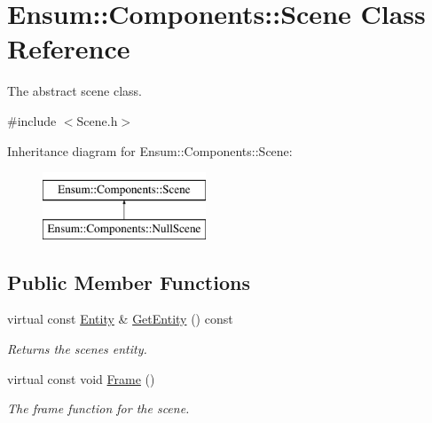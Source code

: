 \hypertarget{class_ensum_1_1_components_1_1_scene}{}\section{Ensum\+:\+:Components\+:\+:Scene Class Reference}
\label{class_ensum_1_1_components_1_1_scene}


The abstract scene class.  




{\ttfamily \#include $<$Scene.\+h$>$}

Inheritance diagram for Ensum\+:\+:Components\+:\+:Scene\+:\begin{figure}[H]
\begin{center}
\leavevmode
\includegraphics[height=2.000000cm]{class_ensum_1_1_components_1_1_scene}
\end{center}
\end{figure}
\subsection*{Public Member Functions}
\begin{DoxyCompactItemize}
\item 
virtual const \hyperlink{struct_ensum_1_1_components_1_1_entity}{Entity} \& \hyperlink{class_ensum_1_1_components_1_1_scene_ab614d491401edd9db3584d4e61ef6416}{Get\+Entity} () const \hypertarget{class_ensum_1_1_components_1_1_scene_ab614d491401edd9db3584d4e61ef6416}{}\label{class_ensum_1_1_components_1_1_scene_ab614d491401edd9db3584d4e61ef6416}

\begin{DoxyCompactList}\small\item\em Returns the scenes entity. \end{DoxyCompactList}\item 
virtual const void \hyperlink{class_ensum_1_1_components_1_1_scene_a4f12d73cbbd3e203bfc60eac07318985}{Frame} ()\hypertarget{class_ensum_1_1_components_1_1_scene_a4f12d73cbbd3e203bfc60eac07318985}{}\label{class_ensum_1_1_components_1_1_scene_a4f12d73cbbd3e203bfc60eac07318985}

\begin{DoxyCompactList}\small\item\em The frame function for the scene. \end{DoxyCompactList}\end{DoxyCompactItemize}
